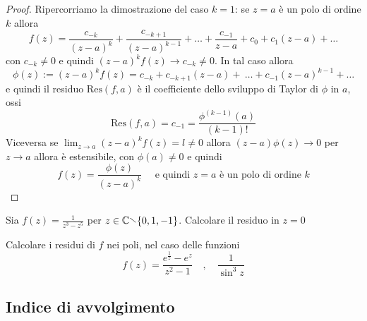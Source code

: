 \begin{proof}
    Ripercorriamo la dimostrazione del caso \(k = 1\): se \(z = a\) è un
    polo di ordine \(k\) allora
    \[
        f{(z)} = \frac{c_{-k} }{{(z-a)}^{k}} + \frac{c_{-k+1} }{{(z-a)}^{k-1}} +
        \dots + \frac{c_{-1} }{z-a} + c_{0} + c_{1}{(z-a)} + \dots
    \]
    con \(c_{-k} \neq 0 \) e quindi \(\displaystyle {(z-a)}^{k}f{(z)} \to c_{-k}
    \neq 0\). In tal caso allora
    \[
        \phi{(z)} := {(z-a)}^{k}f{(z)} = c_{-k} + c_{-k+1}{(z-a)} +~\dots +
        c_{-1} {(z-a)}^{k-1} + \dots
    \]
    e quindi il residuo \(\mathrm{Res} (f, a) \) è il coefficiente dello
    sviluppo di Taylor di \(\phi\) in \(a\), ossi
    \[
        \mathrm{Res} (f, a) = c_{-1} = \frac{\phi^{{(k-1)}}{(a)}}{(k-1)!}
    \]
    Viceversa se \(\displaystyle \lim_{z \to a} {(z-a)}^{k}f{(z)} = l \neq 0\)
    allora \({(z-a)}\phi{(z)} \to 0 \) per \(z\to a\) allora è estensibile, con
    \(\phi {(a)} \neq 0\) e quindi
    \[
        f{(z)} = \frac{\phi{(z)}}{{(z-a)}^{k}} \quad \text{ e quindi } z=a
        \text{ è un polo di ordine } k
    \]
\end{proof}
\begin{eser}
    Sia \(\displaystyle f{(z)} = \frac{1}{z^3 - z^{5}}\) per \(z \in \mathbb{C}
    \sminus \{0, 1, -1\}\). Calcolare il residuo in \(z=0\)
\end{eser}

\begin{eser}
    Calcolare i residui di \(f\) nei poli, nel caso delle funzioni
    \[
      f{(z)} = \frac{e^{\frac{1}{z}} - e^{z}}{z^2-1} \quad , \quad
      \frac{1}{\sin^3 z}
    \]
\end{eser}
\subsection{Indice di avvolgimento}
